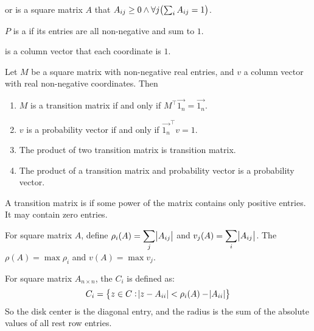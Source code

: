 \begin{definition}
     or  is a square matrix $A$ that $A_{ij} \geq 0 \wedge \forall j \mleft(\sum_{i} A_{ij} = 1 \mright)$.
\end{definition}

\begin{definition}
    $P$ is a  if its entries are all non-negative and sum to $1$.
\end{definition}

\begin{definition}
     is a column vector that each coordinate is $1$.
\end{definition}

\begin{theorem}
    Let $M$ be a square matrix with non-negative real entries, and $v$ a column vector with real non-negative coordinates. Then
    \begin{enumerate}
        \item $M$ is a transition matrix if and only if $M^\top \vec{1_n} = \vec{1_n}$.
        \item $v$ is a probability vector if and only if $\vec{1_n}^\top v = 1$.
        \item The product of two transition matrix is transition matrix.
        \item The product of a transition matrix and probability vector is a probability vector.
    \end{enumerate}    
\end{theorem}

\begin{definition}
    A transition matrix is  if some power of the matrix contains only positive entries. It may contain zero entries.
\end{definition}

\begin{definition}
    For square matrix $A$, define $\displaystyle \rho_i (A) = \sum_j \abs{A_{ij}}$ and $\displaystyle v_j(A) = \sum_i \abs{A_{ij}}$. The  $\rho (A) = \max \rho_i$ and  $v(A) = \max v_j$.
\end{definition}

\begin{definition}
    For square matrix $A_{n \times n}$, the  $C_i$ is defined as:
    \begin{equation}
        C_i = \set{z \in C: \abs{z - A_{ii}} < \rho_i (A) - \abs{A_{ii}}}
    \end{equation}
    So the disk center is the diagonal entry, and the radius is the sum of the absolute values of all rest row entries.
\end{definition}

